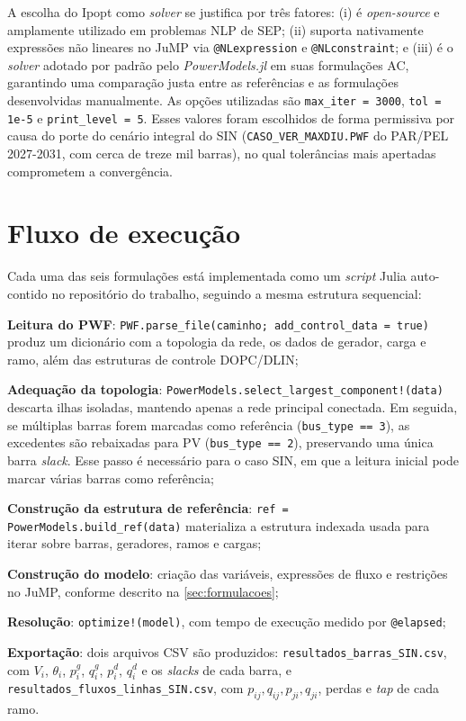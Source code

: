 A escolha do Ipopt como \textit{solver} se justifica por três fatores: (i) é \textit{open-source} e amplamente utilizado em problemas NLP de SEP; (ii) suporta nativamente expressões não lineares no JuMP via \texttt{@NLexpression} e \texttt{@NLconstraint}; e (iii) é o \textit{solver} adotado por padrão pelo \textit{PowerModels.jl} em suas formulações AC, garantindo uma comparação justa entre as referências e as formulações desenvolvidas manualmente. As opções utilizadas são \texttt{max\_iter = 3000}, \texttt{tol = 1e-5} e \texttt{print\_level = 5}. Esses valores foram escolhidos de forma permissiva por causa do porte do cenário integral do SIN (\texttt{CASO\_VER\_MAXDIU.PWF} do PAR/PEL 2027-2031, com cerca de treze mil barras), no qual tolerâncias mais apertadas comprometem a convergência.

\section{Fluxo de execução}
\label{sec:pipeline}

Cada uma das seis formulações está implementada como um \textit{script} Julia auto-contido no repositório do trabalho, seguindo a mesma estrutura sequencial:

\begin{alineascomnumero}
    \item \textbf{Leitura do PWF}: \texttt{PWF.\allowbreak parse\_file(caminho;\allowbreak\ add\_control\_data = true)} produz um dicionário com a topologia da rede, os dados de gerador, carga e ramo, além das estruturas de controle DOPC/DLIN;
    \item \textbf{Adequação da topologia}: \texttt{PowerModels.\allowbreak select\_largest\_\allowbreak component!(data)} descarta ilhas isoladas, mantendo apenas a rede principal conectada. Em seguida, se múltiplas barras forem marcadas como referência (\texttt{bus\_type == 3}), as excedentes são rebaixadas para PV (\texttt{bus\_type == 2}), preservando uma única barra \textit{slack}. Esse passo é necessário para o caso SIN, em que a leitura inicial pode marcar várias barras como referência;
    \item \textbf{Construção da estrutura de referência}: \texttt{ref = PowerModels.\allowbreak build\_ref(data)\allowbreak [:it]\allowbreak [:pm]\allowbreak [:nw]\allowbreak [0]} materializa a estrutura indexada usada para iterar sobre barras, geradores, ramos e cargas;
    \item \textbf{Construção do modelo}: criação das variáveis, expressões de fluxo e restrições no JuMP, conforme descrito na \autoref{sec:formulacoes};
    \item \textbf{Resolução}: \texttt{optimize!(model)}, com tempo de execução medido por \texttt{@elapsed};
    \item \textbf{Exportação}: dois arquivos CSV são produzidos: \texttt{resultados\_\allowbreak barras\_SIN.csv}, com $V_i$, $\theta_i$, $p^g_i$, $q^g_i$, $p^d_i$, $q^d_i$ e os \textit{slacks} de cada barra, e \texttt{resultados\_\allowbreak fluxos\_\allowbreak linhas\_SIN.csv}, com $p_{ij}, q_{ij}, p_{ji}, q_{ji}$, perdas e \textit{tap} de cada ramo.
\end{alineascomnumero}

